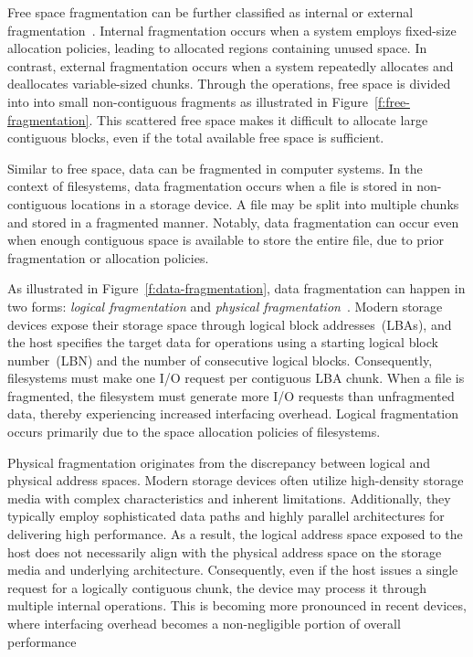 Free space fragmentation can be further classified as internal or external fragmentation~\cite{ostep,os-textbook}.
Internal fragmentation occurs when a system employs fixed-size allocation policies, leading to allocated regions containing unused space.
In contrast, external fragmentation occurs when a system repeatedly allocates and deallocates variable-sized chunks.
Through the operations, free space is divided into into small non-contiguous fragments as illustrated in Figure~\ref{f:free-fragmentation}.
This scattered free space makes it difficult to allocate large contiguous blocks, even if the total available free space is sufficient.


Similar to free space, data can be fragmented in computer systems.
In the context of filesystems, data fragmentation occurs when a file is stored in non-contiguous locations in a storage device.
A file may be split into multiple chunks and stored in a fragmented manner.
Notably, data fragmentation can occur even when enough contiguous space is available to store the entire file, due to prior fragmentation or allocation policies.

As illustrated in Figure~\ref{f:data-fragmentation}, data fragmentation can happen in two forms: \emph{logical fragmentation} and \emph{physical fragmentation}~\cite{janusd:atc17}.
Modern storage devices expose their storage space through logical block addresses~(LBAs), and the host specifies the target data for operations using a starting logical block number~(LBN) and the number of consecutive logical blocks.
Consequently, filesystems must make one I/O request per contiguous LBA chunk.
When a file is fragmented, the filesystem must generate more I/O requests than unfragmented data, thereby experiencing increased interfacing overhead.
Logical fragmentation occurs primarily due to the space allocation policies of filesystems.

Physical fragmentation originates from the discrepancy between logical and physical address spaces.
Modern storage devices often utilize high-density storage media with complex characteristics and inherent limitations.
Additionally, they typically employ sophisticated data paths and highly parallel architectures for delivering high performance.
As a result, the logical address space exposed to the host does not necessarily align with the physical address space on the storage media and underlying architecture.
Consequently, even if the host issues a single request for a logically contiguous chunk, the device may process it through multiple internal operations.
This is becoming more pronounced in recent devices, where interfacing overhead becomes a non-negligible portion of overall performance~\cite{Problem_in_SSD_Empirical,senescence:fast17,Problem_in_SSD_Mobile_Devices,survey:ictc23,no-afraid:fast24,defrag-mobile:atc17,fragpicker:sosp21}



